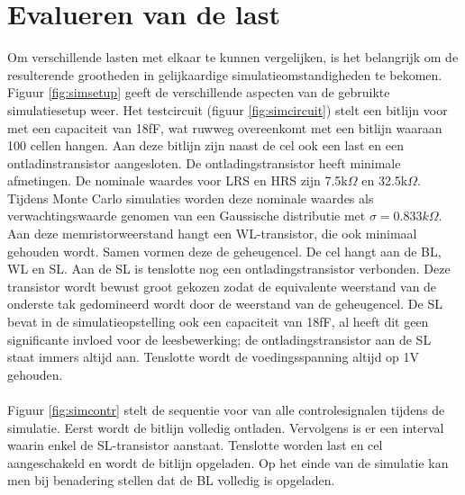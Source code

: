 \section{Evalueren van de last}
Om verschillende lasten met elkaar te kunnen vergelijken, is het belangrijk om de resulterende grootheden in gelijkaardige simulatieomstandigheden te bekomen. Figuur \ref{fig:simsetup} geeft de verschillende aspecten van de gebruikte simulatiesetup weer. Het testcircuit (figuur \ref{fig:simcircuit}) stelt een bitlijn voor met een capaciteit van 18fF, wat ruwweg overeenkomt met een bitlijn waaraan 100 cellen hangen. Aan deze bitlijn zijn naast de cel ook een last en een ontladinstransistor aangesloten. De ontladingstransistor heeft minimale afmetingen. De nominale waardes voor LRS en HRS zijn 7.5k$\Omega$ en 32.5k$\Omega$. Tijdens Monte Carlo simulaties worden deze nominale waardes als verwachtingswaarde genomen van een Gaussische distributie met $\sigma = 0.833k\Omega$. Aan deze memristorweerstand hangt een WL-transistor, die ook minimaal gehouden wordt. Samen vormen deze de geheugencel. De cel hangt aan de BL, WL en SL. Aan de SL is tenslotte nog een ontladingstransistor verbonden. Deze transistor wordt bewust groot gekozen zodat de equivalente weerstand van de onderste tak gedomineerd wordt door de weerstand van de geheugencel. De SL bevat in de simulatieopstelling ook een capaciteit van 18fF, al heeft dit geen significante invloed voor de leesbewerking; de ontladingstransistor aan de SL staat immers altijd aan. Tenslotte wordt de voedingsspanning altijd op 1V gehouden.\\\\
Figuur \ref{fig:simcontr} stelt de sequentie voor van alle controlesignalen tijdens de simulatie. Eerst wordt de bitlijn volledig ontladen. Vervolgens is er een interval waarin enkel de SL-transistor aanstaat. Tenslotte worden last en cel aangeschakeld en wordt de bitlijn opgeladen. Op het einde van de simulatie kan men bij benadering stellen dat de BL volledig is opgeladen.\\

